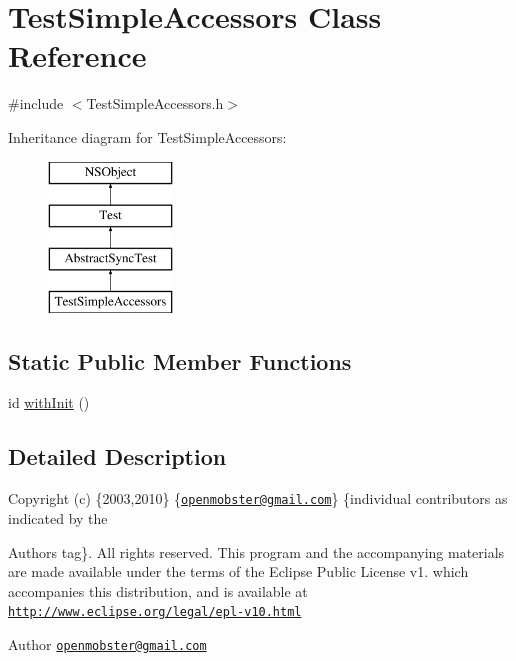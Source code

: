 \hypertarget{interface_test_simple_accessors}{
\section{\-Test\-Simple\-Accessors \-Class \-Reference}
\label{interface_test_simple_accessors}
}


{\ttfamily \#include $<$\-Test\-Simple\-Accessors.\-h$>$}

\-Inheritance diagram for \-Test\-Simple\-Accessors\-:\begin{figure}[H]
\begin{center}
\leavevmode
\includegraphics[height=4.000000cm]{interface_test_simple_accessors}
\end{center}
\end{figure}
\subsection*{\-Static \-Public \-Member \-Functions}
\begin{DoxyCompactItemize}
\item 
id \hyperlink{interface_test_simple_accessors_a32a391a537ca4409825bac5c2261b32f}{with\-Init} ()
\end{DoxyCompactItemize}


\subsection{\-Detailed \-Description}
\-Copyright (c) \{2003,2010\} \{\href{mailto:openmobster@gmail.com}{\tt openmobster@gmail.\-com}\} \{individual contributors as indicated by the \begin{DoxyAuthor}{\-Authors}
tag\}. \-All rights reserved. \-This program and the accompanying materials are made available under the terms of the \-Eclipse \-Public \-License v1. which accompanies this distribution, and is available at \href{http://www.eclipse.org/legal/epl-v10.html}{\tt http\-://www.\-eclipse.\-org/legal/epl-\/v10.\-html}
\end{DoxyAuthor}
\begin{DoxyAuthor}{\-Author}
\href{mailto:openmobster@gmail.com}{\tt openmobster@gmail.\-com} 
\end{DoxyAuthor}


